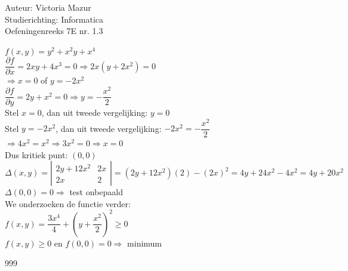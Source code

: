 \documentclass[a4paper]{article}
\begin{document}
  
\noindent \large Auteur: Victoria Mazur \\
\noindent \large Studierichting: Informatica\\
\noindent \large Oefeningenreeks 7E nr. 1.3\\

\medskip

\normalsize

$f(x, y) = y^2 + x^2 y + x^4$ \\

$\dfrac{\partial f}{\partial x} = 2xy + 4x^3 = 0 \Rightarrow 2x(y + 2x^2) = 0$ \\

$\Rightarrow x = 0$ of $y = -2x^2$ \\

$\dfrac{\partial f}{\partial y} = 2y + x^2 = 0 \Rightarrow y = -\dfrac{x^2}{2}$ \\

Stel $x = 0$, dan uit tweede vergelijking: $y = 0$ \\

Stel $y = -2x^2$, dan uit tweede vergelijking: $-2x^2 = -\dfrac{x^2}{2}$ \\

$\Rightarrow 4x^2 = x^2 \Rightarrow 3x^2 = 0 \Rightarrow x = 0$ \\

Dus kritiek punt: $(0, 0)$ \\

$\Delta(x, y) = \left|
\begin{array}{cc}
2y + 12x^2 & 2x \\
2x & 2
\end{array}
\right| = (2y + 12x^2)(2) - (2x)^2 = 4y + 24x^2 - 4x^2 = 4y + 20x^2$ \\

$\Delta(0, 0) = 0 \Rightarrow$ test onbepaald \\

We onderzoeken de functie verder: \\

$f(x, y) = \dfrac{3x^4}{4} + \left(y + \dfrac{x^2}{2}\right)^2 \geq 0$ \\

$f(x, y) \geq 0$ en $f(0, 0) = 0 \Rightarrow$ minimum \\

\begin{thebibliography}{999}
\end{thebibliography}
\end{document}
